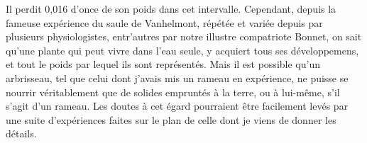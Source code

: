 Il perdit 0,016 d'once de son poids dans cet intervalle.
\setcounter{page}{183} Cependant, depuis la fameuse expérience du saule de Vanhelmont, répétée et variée depuis par plusieurs physiologistes, entr'autres par notre illustre compatriote Bonnet, on sait qu'une plante qui peut vivre dans l'eau seule, y acquiert tous ses développemens, et tout le poids par lequel ils sont représentés.
Mais il est possible qu'un arbrisseau, tel que celui dont j'avais mis un rameau en expérience, ne puisse se nourrir véritablement que de solides empruntés à la terre, ou à lui-même, s'il s'agit d'un rameau. Les doutes à cet égard pourraient être facilement levés par une suite d'expériences faites sur le plan de celle dont je viens de donner les détails.